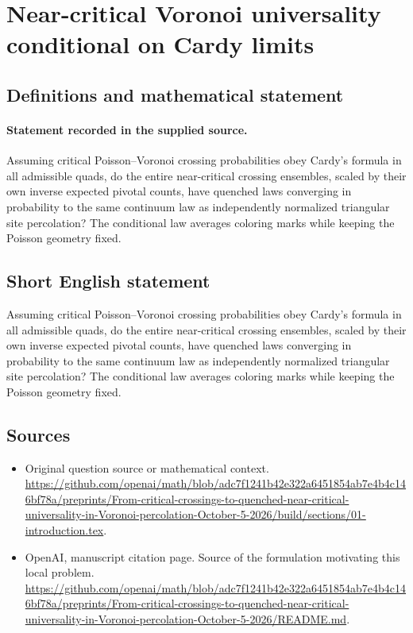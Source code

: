\documentclass[11pt]{article}
\begin{document}
\section*{Near-critical Voronoi universality conditional on Cardy limits}\label{statement}
\subsection{Definitions and mathematical statement}
\paragraph{Statement recorded in the supplied source.}
Assuming critical Poisson–Voronoi crossing probabilities obey Cardy’s formula in all admissible quads, do the entire near-critical crossing ensembles, scaled by their own inverse expected pivotal counts, have quenched laws converging in probability to the same continuum law as independently normalized triangular site percolation? The conditional law averages coloring marks while keeping the Poisson geometry fixed.
\subsection{Short English statement}
Assuming critical Poisson–Voronoi crossing probabilities obey Cardy’s formula in all admissible quads, do the entire near-critical crossing ensembles, scaled by their own inverse expected pivotal counts, have quenched laws converging in probability to the same continuum law as independently normalized triangular site percolation? The conditional law averages coloring marks while keeping the Poisson geometry fixed.
\subsection{Sources}
\begin{itemize}
\item[S1] Original question source or mathematical context.
\url{https://github.com/openai/math/blob/adc7f1241b42e322a6451854ab7e4b4c146bf78a/preprints/From-critical-crossings-to-quenched-near-critical-universality-in-Voronoi-percolation-October-5-2026/build/sections/01-introduction.tex}.
\item[S2] OpenAI, manuscript citation page. Source of the formulation motivating this local problem.
\url{https://github.com/openai/math/blob/adc7f1241b42e322a6451854ab7e4b4c146bf78a/preprints/From-critical-crossings-to-quenched-near-critical-universality-in-Voronoi-percolation-October-5-2026/README.md}.
\end{itemize}
\end{document}
